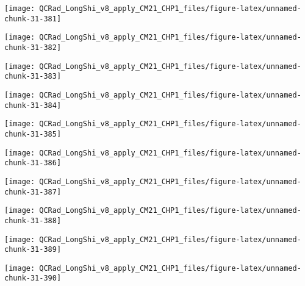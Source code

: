\documentclass[
  10pt,
  a4paper,oneside]{article}
\begin{document}
\begin{center}\texttt{[image: QCRad\_LongShi\_v8\_apply\_CM21\_CHP1\_files/figure-latex/unnamed-chunk-31-381]} \end{center}

\begin{center}\texttt{[image: QCRad\_LongShi\_v8\_apply\_CM21\_CHP1\_files/figure-latex/unnamed-chunk-31-382]} \end{center}

\begin{center}\texttt{[image: QCRad\_LongShi\_v8\_apply\_CM21\_CHP1\_files/figure-latex/unnamed-chunk-31-383]} \end{center}

\begin{center}\texttt{[image: QCRad\_LongShi\_v8\_apply\_CM21\_CHP1\_files/figure-latex/unnamed-chunk-31-384]} \end{center}

\begin{center}\texttt{[image: QCRad\_LongShi\_v8\_apply\_CM21\_CHP1\_files/figure-latex/unnamed-chunk-31-385]} \end{center}

\begin{center}\texttt{[image: QCRad\_LongShi\_v8\_apply\_CM21\_CHP1\_files/figure-latex/unnamed-chunk-31-386]} \end{center}

\begin{center}\texttt{[image: QCRad\_LongShi\_v8\_apply\_CM21\_CHP1\_files/figure-latex/unnamed-chunk-31-387]} \end{center}

\begin{center}\texttt{[image: QCRad\_LongShi\_v8\_apply\_CM21\_CHP1\_files/figure-latex/unnamed-chunk-31-388]} \end{center}

\begin{center}\texttt{[image: QCRad\_LongShi\_v8\_apply\_CM21\_CHP1\_files/figure-latex/unnamed-chunk-31-389]} \end{center}

\begin{center}\texttt{[image: QCRad\_LongShi\_v8\_apply\_CM21\_CHP1\_files/figure-latex/unnamed-chunk-31-390]} \end{center}
\end{document}
